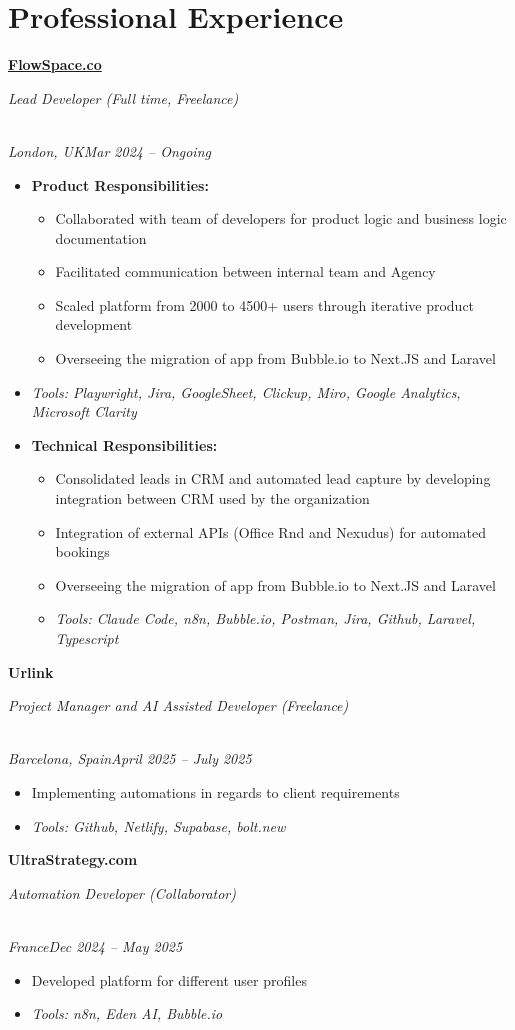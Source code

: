 \documentclass[a4paper,10pt]{article}
\newcommand{\role}[4]{\vspace{3pt}\noindent\hspace{0.6em}\parbox[t]{0.38\textwidth}{\raggedright\textbf{#1}}\hfill\parbox[t]{0.58\textwidth}{\raggedleft\textit{#2}}\\{\textit{#3}\hfill\textit{#4}}\vspace{1pt}}
\begin{document}
\section{Professional Experience}
\role{\href{https://flowspace.co}{FlowSpace.co}}{Lead Developer (Full time, Freelance)}{London, UK}{Mar 2024 -- Ongoing}
\begin{itemize}
\item \textbf{Product Responsibilities:}
\begin{itemize}[label=--]
\item Collaborated with team of developers for product logic and business logic documentation
\item Facilitated communication between internal team and Agency
\item Scaled platform from 2000 to 4500+ users through iterative product development
\item Overseeing the migration of app from Bubble.io to Next.JS and Laravel
\end{itemize}
\item \textit{Tools: Playwright, Jira, GoogleSheet, Clickup, Miro, Google Analytics, Microsoft Clarity}
\item \textbf{Technical Responsibilities:}
\begin{itemize}[label=--]
\item Consolidated leads in CRM and automated lead capture by developing integration between CRM used by the organization
\item Integration of external APIs (Office Rnd and Nexudus) for automated bookings
\item Overseeing the migration of app from Bubble.io to Next.JS and Laravel
\item \textit{Tools: Claude Code, n8n, Bubble.io, Postman, Jira, Github, Laravel, Typescript}
\end{itemize}
\end{itemize}

\role{Urlink}{Project Manager and AI Assisted Developer (Freelance)}{Barcelona, Spain}{April 2025 -- July 2025}
\begin{itemize}
\item Implementing automations in regards to client requirements
\item \textit{Tools: Github, Netlify, Supabase, bolt.new}
\end{itemize}

\role{UltraStrategy.com}{Automation Developer (Collaborator)}{France}{Dec 2024 -- May 2025}
\begin{itemize}
\item Developed platform for different user profiles
\item \textit{Tools: n8n, Eden AI, Bubble.io}
\end{itemize}
\end{document}
